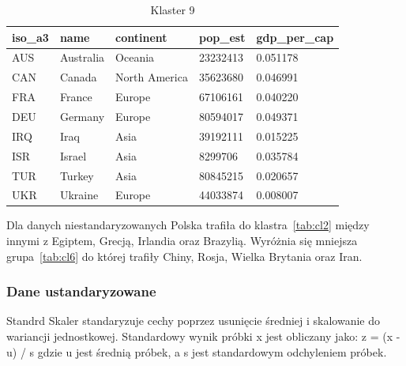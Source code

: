 \documentclass[11pt]{report}
\begin{document}
    \begin{table}[h!]
        \caption {Klaster 9} \label{tab:cl9}
        \begin{tabular}{lllll}
            \hline
            \multicolumn{1}{|l|}{iso\_a3} & \multicolumn{1}{l|}{name} & \multicolumn{1}{l|}{continent} & \multicolumn{1}{l|}{pop\_est} & \multicolumn{1}{l|}{gdp\_per\_cap} \\ \hline
            AUS                           & Australia                 & Oceania                        & 23232413                      & 0.051178                           \\
            CAN                           & Canada                    & North America                  & 35623680                      & 0.046991                           \\
            FRA                           & France                    & Europe                         & 67106161                      & 0.040220                           \\
            DEU                           & Germany                   & Europe                         & 80594017                      & 0.049371                           \\
            IRQ                           & Iraq                      & Asia                           & 39192111                      & 0.015225                           \\
            ISR                           & Israel                    & Asia                           & 8299706                       & 0.035784                           \\
            TUR                           & Turkey                    & Asia                           & 80845215                      & 0.020657                           \\
            UKR                           & Ukraine                   & Europe                         & 44033874                      & 0.008007
        \end{tabular}
    \end{table}

    Dla danych niestandaryzowanych Polska trafiła do klastra~\ref{tab:cl2} między innymi z Egiptem, Grecją, Irlandia oraz Brazylią.
    Wyróżnia się mniejsza grupa~\ref{tab:cl6} do której trafiły Chiny, Rosja, Wielka Brytania oraz Iran.

    \subsubsection{Dane ustandaryzowane}
    Standrd Skaler standaryzuje cechy poprzez usunięcie średniej i skalowanie do wariancji jednostkowej.
    Standardowy wynik próbki x jest obliczany jako:
    z = (x - u) / s
    gdzie u jest średnią próbek, a s jest standardowym odchyleniem próbek.
\end{document}
